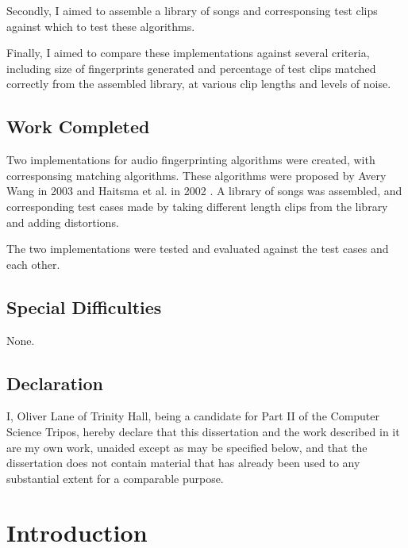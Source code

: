\documentclass[12pt,a4paper,twoside,openright]{report}
\begin{document}
Secondly, I aimed to assemble a library of songs and corresponsing test clips against which to test these algorithms.

Finally, I aimed to compare these implementations against several criteria, including size of fingerprints generated and percentage of test clips matched correctly from the assembled library, at various clip lengths and levels of noise.

\section*{Work Completed}

Two implementations for audio fingerprinting algorithms were created, with corresponsing matching algorithms. These algorithms were proposed by Avery Wang in 2003 \cite{Wang03} and Haitsma et al. in 2002 \cite{Haitsma02}. A library of songs was assembled, and corresponding test cases made by taking different length clips from the library and adding distortions.

The two implementations were tested and evaluated against the test cases and each other.

\section*{Special Difficulties}

None.

 
\newpage
\section*{Declaration}

I, Oliver Lane of Trinity Hall, being a candidate for Part II of the Computer Science Tripos, hereby declare that this dissertation and the work described in  it are my own work, unaided except as may be specified below, and that the  dissertation does not contain material that has already been used to any  substantial extent for a comparable purpose.

\bigskip
{}

\medskip
{}

\tableofcontents

\listoffigures



\pagestyle{headings}

\chapter{Introduction}
\end{document}

